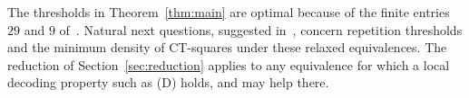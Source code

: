 \documentclass[11pt]{amsart}
\theoremstyle{definition}
\theoremstyle{remark}
\begin{document}
The thresholds in Theorem~\ref{thm:main} are optimal because of the finite entries $29$ and $9$ of~\cite[Table~1]{SMKI2026}. Natural next questions, suggested in~\cite{SMKI2026}, concern repetition thresholds and the minimum density of CT-squares under these relaxed equivalences. The reduction of Section~\ref{sec:reduction} applies to any equivalence for which a local decoding property such as (D) holds, and may help there.



\end{document}
